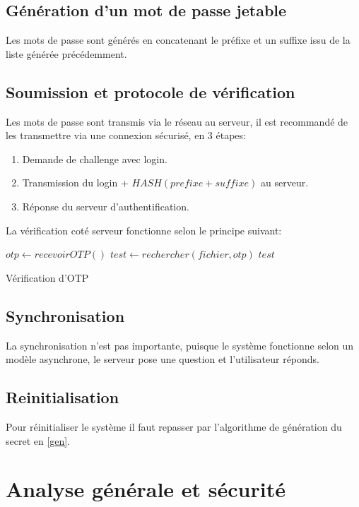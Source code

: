 \documentclass{../res/univ-projet}
\begin{document}
\subsection{Génération d'un mot de passe jetable}
Les mots de passe sont générés en concatenant le préfixe et un suffixe 
issu de la liste générée précédemment.

\subsection{Soumission et protocole de vérification}
Les mots de passe sont transmis via le réseau au serveur, il est
recommandé de les transmettre via une connexion sécurisé, en 3 étapes:
\begin{enumerate}
    \item Demande de challenge avec login.
    \item Transmission du login + $HASH(prefixe+suffixe)$ au serveur.
    \item Réponse du serveur d'authentification.
\end{enumerate}

La vérification coté serveur fonctionne selon le principe suivant:
\begin{algorithm}
    \begin{algorithmic}
        \STATE $otp \leftarrow recevoirOTP()$
        \STATE $test \leftarrow rechercher(fichier, otp)$
        \ENDIF
        \RETURN $test$
    \end{algorithmic}
    \caption{Vérification d'OTP}
\end{algorithm}

\subsection{Synchronisation}
La synchronisation n'est pas importante, puisque le système fonctionne
selon un modèle asynchrone, le serveur pose une question et l'utilisateur
réponds.

\subsection{Reinitialisation}
Pour réinitialiser le système il faut repasser par l'algorithme de 
génération du secret en \ref{gen}.

\section{Analyse générale et sécurité}
\end{document}
